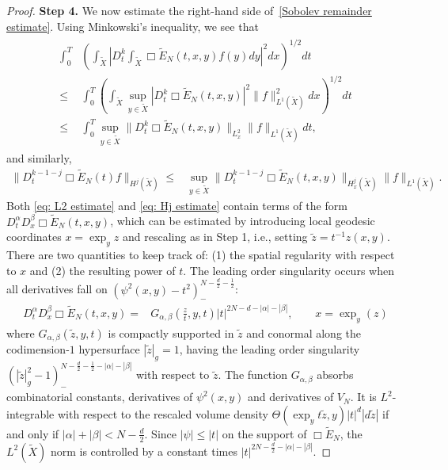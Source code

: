\documentclass[11pt,letterpaper,oneside]{amsart}
\theoremstyle{definition}
\theoremstyle{remark}
\newcommand{\wt}{\widetilde}
\theoremstyle{definition}
\theoremstyle{remark}
\begin{document}
\begin{proof}
    \noindent \textbf{Step 4.} We now estimate the right-hand side of~\eqref{Sobolev remainder estimate}. Using Minkowski's inequality, we see that
    \begin{align}
    \label{eq: L2 estimate}
    \begin{split}
    \int_0^T & \left( \int_{\wt X} \left|D_t^{k} \int_{\wt X} \Box \wt E_N(t,x,y) f(y) dy\right|^2 dx \right)^{1/2} dt
    \\
    \leq &
    \int_0^T \left( \int_{\wt X}  \sup_{y \in \wt X} |D_t^{k} \Box \wt E_N(t,x,y)|^2 \|f\|_{L^1(\wt X)}^2 dx \right)^{1/2} dt
    \\
    \leq &
    \int_0^T \sup_{y \in \wt X} \|D_t^k \Box \wt E_N (t,x,y) \|_{L_x^2} \|f \|_{L^1(\wt X)} dt,
    \end{split}
    \end{align}
    and similarly,
    \begin{align}\label{eq: Hj estimate}
    \|D_t^{k - 1 - j} \Box \wt E_N(t)f \|_{H^j(\wt X)} \leq & \sup_{y \in \wt X} \|D_t^{k - 1 - j} \Box \wt E_N(t,x,y)\|_{H_x^j(\wt X)} \|f\|_{L^1(\wt X)}.
    \end{align}
    Both \eqref{eq: L2 estimate} and \eqref{eq: Hj estimate} contain terms of the form $D_t^\alpha D_x^\beta \Box \wt E_N(t,x,y)$, which can be estimated by introducing local geodesic coordinates $x = \exp_y z$ and rescaling as in Step 1, i.e., setting $\wt z = t^{-1} z(x,y)$. There are two quantities to keep track of: (1) the spatial regularity with respect to $x$ and (2) the resulting power of $t$. The leading order singularity occurs when all derivatives fall on $(\psi^2(x,y) - t^2)_-^{N - \frac{d}{2} - \frac{1}{2}}$:
    \begin{align*}
    D_t^\alpha D_x^\beta \Box \wt E_N(t,x,y) =& 
    G_{\alpha, \beta}(\frac{z}{t},y, t) |t|^{2N - d - |\alpha| - |\beta|}, \qquad x = \exp_y(z)
    \end{align*}
    where $G_{\alpha, \beta} (\wt z, y, t)$ is compactly supported in $\wt z$ and conormal along the codimension-$1$ hypersurface $|\wt z|_g = 1$, having the leading order singularity $(|\wt z|_{g}^2 - 1)_-^{N - \frac{d}{2} - \frac{1}{2} - |\alpha| - |\beta|}$ with respect to $\wt z$. The function $G_{\alpha, \beta}$ absorbs combinatorial constants, derivatives of $\psi^2(x,y)$ and derivatives of $V_N$. It is $L^2$-integrable with respect to the rescaled volume density $\Theta (\exp_y t \wt z , y) |t|^d |d \wt z|$ if and only if $|\alpha| + |\beta| < N - \frac{d}{2}$. Since $|\psi| \leq |t|$ on the support of $\Box \wt E_N$, the $L^2 (\wt X)$ norm is controlled by a constant times $|t|^{2N - \frac{d}{2} - |\alpha| - |\beta|}$.
    

\end{proof}
\end{document}
